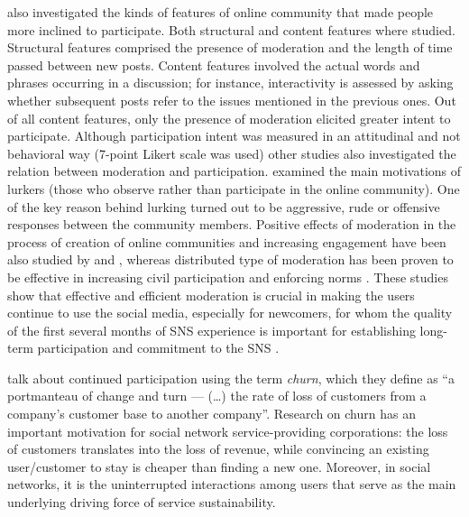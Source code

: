 \documentclass[a4paper,fleqn]{cas-dc}
\begin{document}
\citet{wise2006moderation} also investigated the kinds of features of online community that made people more inclined to participate. Both structural and content features where studied.  Structural features comprised the presence of moderation and the length of time passed between new posts. Content features involved the actual words and phrases occurring in a discussion; for instance, interactivity is assessed by asking whether subsequent posts refer to the issues mentioned in the previous ones.  
Out of all content features, only the presence of moderation elicited greater intent to participate.
Although participation intent was measured in an attitudinal and not behavioral way (7-point Likert scale was used) other studies also investigated the relation between moderation and participation. \citet{preece2004top} examined the main motivations of lurkers (those who observe rather than participate in the online community). One of the key reason behind lurking turned out to be aggressive, rude or offensive responses between the community members. Positive effects of moderation in the process of creation of online communities and increasing engagement have 
been also studied by \citet{meyer2014moderation} and \citet{carey2016influences}, whereas distributed type of moderation has been proven to be effective in increasing civil participation and enforcing norms \citep{lampe2014crowdsourcing}. These studies show that effective and efficient moderation is crucial in making the users continue to use the social media, especially for newcomers, for whom the quality of the first several months of SNS experience is important for  establishing long-term participation and commitment to the SNS \citep{raub2015phenomenological}.



\citet{sadeque2019predicting} talk about continued participation using the term \textit{churn}, which they define as ``a portmanteau of change and turn --- (\dots) 
the rate of loss of customers from a company's customer base to another company''. Research on churn has an important motivation for social network service-providing corporations: the loss of customers translates into the loss of revenue, while convincing an existing user/customer to stay is cheaper than finding a new one. Moreover, in social networks, 
it is the uninterrupted 
interactions among users that serve as the main underlying driving force of service sustainability.
\end{document}
